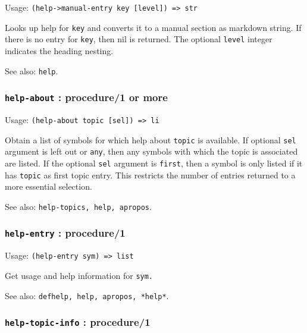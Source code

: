 \documentclass[
]{article}
\newcommand{\passthrough}[1]{#1}
\begin{document}
Usage: \passthrough{\lstinline!(help->manual-entry key [level]) => str!}

Looks up help for \passthrough{\lstinline!key!} and converts it to a
manual section as markdown string. If there is no entry for
\passthrough{\lstinline!key!}, then nil is returned. The optional
\passthrough{\lstinline!level!} integer indicates the heading nesting.

See also: \passthrough{\lstinline!help!}.

\hypertarget{help-about-procedure1-or-more}{%
\subsubsection{\texorpdfstring{\texttt{help-about} : procedure/1 or
more}{help-about : procedure/1 or more}}\label{help-about-procedure1-or-more}}

Usage: \passthrough{\lstinline!(help-about topic [sel]) => li!}

Obtain a list of symbols for which help about
\passthrough{\lstinline!topic!} is available. If optional
\passthrough{\lstinline!sel!} argument is left out or
\passthrough{\lstinline!any!}, then any symbols with which the topic is
associated are listed. If the optional \passthrough{\lstinline!sel!}
argument is \passthrough{\lstinline!first!}, then a symbol is only
listed if it has \passthrough{\lstinline!topic!} as first topic entry.
This restricts the number of entries returned to a more essential
selection.

See also: \passthrough{\lstinline!help-topics, help, apropos!}.

\hypertarget{help-entry-procedure1}{%
\subsubsection{\texorpdfstring{\texttt{help-entry} :
procedure/1}{help-entry : procedure/1}}\label{help-entry-procedure1}}

Usage: \passthrough{\lstinline!(help-entry sym) => list!}

Get usage and help information for \passthrough{\lstinline!sym.!}

See also: \passthrough{\lstinline!defhelp, help, apropos, *help*!}.

\hypertarget{help-topic-info-procedure1}{%
\subsubsection{\texorpdfstring{\texttt{help-topic-info} :
procedure/1}{help-topic-info : procedure/1}}\label{help-topic-info-procedure1}}
\end{document}
